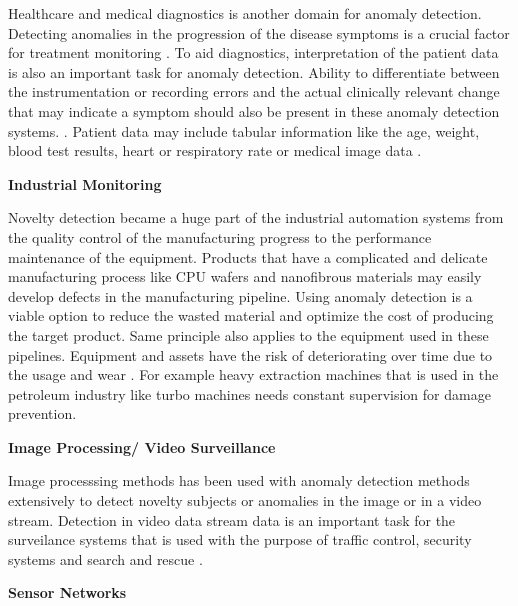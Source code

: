 {Healthcare and medical diagnostics is another domain for anomaly detection. Detecting anomalies in
the progression of the disease symptoms is a crucial factor for treatment monitoring
\cite{Schlegl2017UnsupervisedAD}. To aid diagnostics, interpretation of the patient data is also an
important task for anomaly detection. Ability to differentiate between the instrumentation or
recording errors and the actual clinically relevant change that may indicate a symptom should also
be present in these anomaly detection systems. \cite{Pimentel:2014:RRN:2588908.2589196}. Patient
data may include tabular information like the age, weight, blood test results, heart or
respiratory rate \cite{inproceedings_medical}\cite{Markou:2003:NDR:959414.959416} or medical image data
\cite{Schlegl2017UnsupervisedAD}. 

\textbf{ Industrial Monitoring}

Novelty detection became a huge part of the industrial automation systems from the quality control
of the manufacturing progress to the performance maintenance of the equipment. Products that have
a complicated and delicate manufacturing process like CPU wafers \cite{Kim:2012:MLN:2076800.2076903} and nanofibrous
materials \cite{Napoletano2018anomaly} may easily develop defects in the manufacturing pipeline. Using
anomaly detection is a viable option to reduce the wasted material and optimize the cost of
producing the target product. Same principle also applies to the equipment used in these pipelines.
Equipment and assets have the risk of deteriorating over time due to the usage
and wear \cite{Pimentel:2014:RRN:2588908.2589196}. For example heavy extraction machines that is used in the
petroleum industry like turbo machines \cite{s150202774} needs constant supervision for damage
prevention. 

\textbf{ Image Processing/ Video Surveillance}

Image processsing methods has been used with anomaly detection methods extensively to detect novelty
subjects or anomalies in the image or in a video stream. Detection in video data stream data is an
important task for the surveilance systems that is used with the purpose of traffic control,
security systems and search and rescue \cite{image_anomaly}.

\textbf{ Sensor Networks}

}
